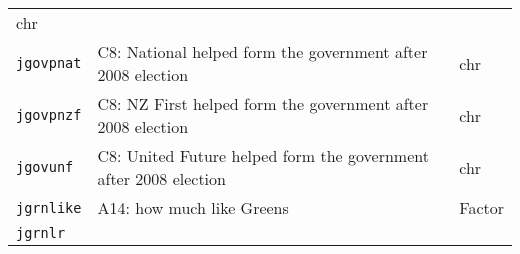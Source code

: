 \documentclass[]{article}
\begin{document}
\begin{longtable}[]{@{}lll@{}}
\begin{minipage}[t]{0.08\columnwidth}
chr\strut
\end{minipage}\tabularnewline
\begin{minipage}[t]{0.14\columnwidth}\raggedright\strut
\texttt{jgovpnat}\strut
\end{minipage} & \begin{minipage}[t]{0.70\columnwidth}\raggedright\strut
C8: National helped form the government after 2008 election\strut
\end{minipage} & \begin{minipage}[t]{0.08\columnwidth}\raggedright\strut
chr\strut
\end{minipage}\tabularnewline
\begin{minipage}[t]{0.14\columnwidth}\raggedright\strut
\texttt{jgovpnzf}\strut
\end{minipage} & \begin{minipage}[t]{0.70\columnwidth}\raggedright\strut
C8: NZ First helped form the government after 2008 election\strut
\end{minipage} & \begin{minipage}[t]{0.08\columnwidth}\raggedright\strut
chr\strut
\end{minipage}\tabularnewline
\begin{minipage}[t]{0.14\columnwidth}\raggedright\strut
\texttt{jgovunf}\strut
\end{minipage} & \begin{minipage}[t]{0.70\columnwidth}\raggedright\strut
C8: United Future helped form the government after 2008 election\strut
\end{minipage} & \begin{minipage}[t]{0.08\columnwidth}\raggedright\strut
chr\strut
\end{minipage}\tabularnewline
\begin{minipage}[t]{0.14\columnwidth}\raggedright\strut
\texttt{jgrnlike}\strut
\end{minipage} & \begin{minipage}[t]{0.70\columnwidth}\raggedright\strut
A14: how much like Greens\strut
\end{minipage} & \begin{minipage}[t]{0.08\columnwidth}\raggedright\strut
Factor\strut
\end{minipage}\tabularnewline
\begin{minipage}[t]{0.14\columnwidth}\raggedright\strut
\texttt{jgrnlr}\strut
\end{minipage} & \begin{minipage}[t]{0.70\columnwidth}\raggedright\strut

\end{minipage}
\end{longtable}
\end{document}
